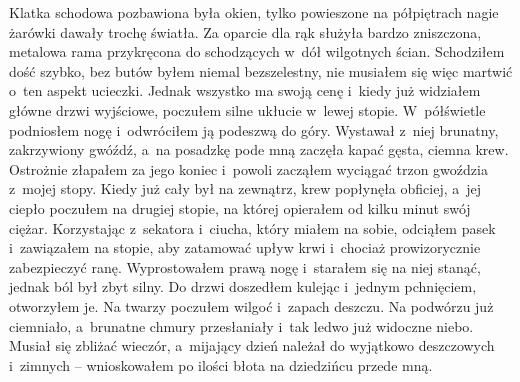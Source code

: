 Klatka schodowa pozbawiona była okien, tylko powieszone na półpiętrach nagie żarówki dawały trochę światła. Za oparcie dla rąk służyła bardzo zniszczona, metalowa rama przykręcona do schodzących w~dół wilgotnych ścian. Schodziłem dość szybko, bez butów byłem niemal bezszelestny, nie musiałem się więc martwić o~ten aspekt ucieczki. Jednak wszystko ma swoją cenę i~kiedy już widziałem główne drzwi wyjściowe, poczułem silne ukłucie w~lewej stopie. W~półświetle podniosłem nogę i~odwróciłem ją podeszwą do góry. Wystawał z~niej brunatny, zakrzywiony gwóźdź, a~na posadzkę pode mną zaczęła kapać gęsta, ciemna krew. Ostrożnie złapałem za jego koniec i~powoli zacząłem wyciągać trzon gwoździa z~mojej stopy. Kiedy już cały był na zewnątrz, krew popłynęła obficiej, a~jej ciepło poczułem na drugiej stopie, na której opierałem od kilku minut swój ciężar. Korzystając z~sekatora i~ciucha, który miałem na sobie, odciąłem pasek i~zawiązałem na stopie, aby zatamować upływ krwi i~chociaż prowizorycznie zabezpieczyć ranę. Wyprostowałem prawą nogę i~starałem się na niej stanąć, jednak ból był zbyt silny. Do drzwi doszedłem kulejąc i~jednym pchnięciem, otworzyłem je. Na twarzy poczułem wilgoć i~zapach deszczu. Na podwórzu już ciemniało, a~brunatne chmury przesłaniały i~tak ledwo już widoczne niebo. Musiał się zbliżać wieczór, a~mijający dzień należał do wyjątkowo deszczowych i~zimnych -- wnioskowałem po ilości błota na dziedzińcu przede mną.

